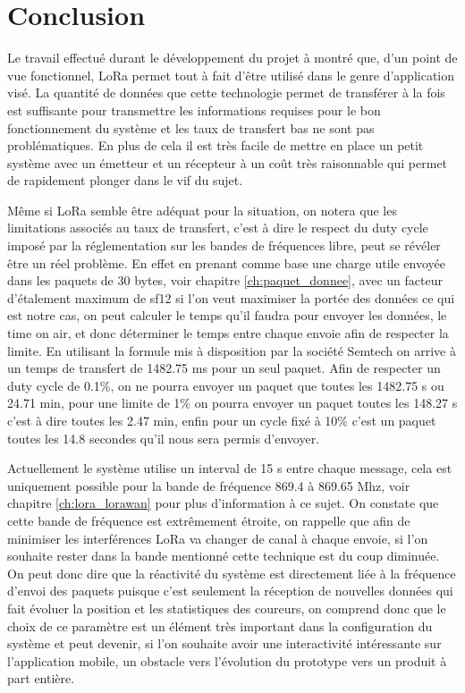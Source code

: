 
\chapter{Conclusion}

Le travail effectué durant le développement du projet à montré que, d'un point de vue fonctionnel, LoRa permet tout à fait d'être utilisé dans le genre d'application visé. La quantité de données que cette technologie permet de transférer à la fois est suffisante pour transmettre les informations requises pour le bon fonctionnement du système et les taux de transfert bas ne sont pas problématiques. En plus de cela il est très facile de mettre en place un petit système avec un émetteur et un récepteur à un coût très raisonnable qui permet de rapidement plonger dans le vif du sujet.

Même si LoRa semble être adéquat pour la situation, on notera que les limitations associés au taux de transfert, c'est à dire le respect du duty cycle imposé par la réglementation sur les bandes de fréquences libre, peut se révéler être un réel problème. En effet en prenant comme base une charge utile envoyée dans les paquets de 30 bytes, voir chapitre \ref{ch:paquet_donnee}, avec un facteur d'étalement maximum de sf12 si l'on veut maximiser la portée des données ce qui est notre cas, on peut calculer le temps qu'il faudra pour envoyer les données, le time on air, et donc déterminer le temps entre chaque envoie afin de respecter la limite. En utilisant la formule mis à disposition par la société Semtech on arrive à un temps de transfert de 1482.75 ms pour un seul paquet. Afin de respecter un duty cycle de 0.1\%, on ne pourra envoyer un paquet que toutes les 1482.75 s ou 24.71 min, pour une limite de 1\% on pourra envoyer un paquet toutes les 148.27 s c'est à dire toutes les 2.47 min, enfin pour un cycle fixé à 10\% c'est un paquet toutes les 14.8 secondes qu'il nous sera permis d'envoyer. \cite{lora_design_guide}

Actuellement le système utilise un interval de 15 s entre chaque message, cela est uniquement possible pour la bande de fréquence 869.4 à 869.65 Mhz, voir chapitre  \ref{ch:lora_lorawan} pour plus d'information à ce sujet. On constate que cette bande de fréquence est extrêmement étroite, on rappelle que afin de minimiser les interférences LoRa va changer de canal à chaque envoie, si l'on souhaite rester dans la bande mentionné cette technique est du coup diminuée. On peut donc dire que la réactivité du système est directement liée à la fréquence d'envoi des paquets puisque c'est seulement la réception de nouvelles données qui fait évoluer la position et les statistiques des coureurs, on comprend donc que le choix de ce paramètre est un élément très important dans la configuration du système et peut devenir, si l'on souhaite avoir une interactivité intéressante sur l'application mobile, un obstacle vers l'évolution du prototype vers un produit à part entière.

